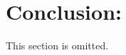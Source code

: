 \documentclass{article}
\begin{document}
\singlespace
\newpage

\section*{Conclusion:}
This section is omitted.
\end{document}
